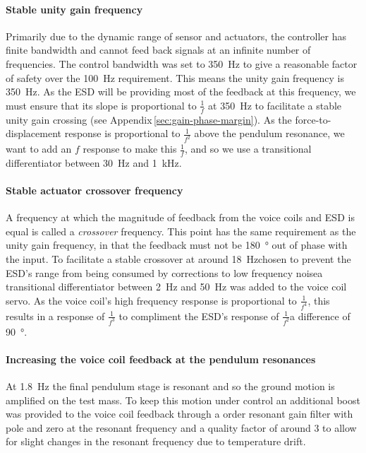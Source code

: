 \paragraph{Stable unity gain frequency}
Primarily due to the dynamic range of sensor and actuators, the controller has finite bandwidth and cannot feed back signals at an infinite number of frequencies. The control bandwidth was set to \SI{350}{\hertz} to give a reasonable factor of safety over the \SI{100}{\hertz} requirement. This means the unity gain frequency is \SI{350}{\hertz}. As the \gls{ESD} will be providing most of the feedback at this frequency, we must ensure that its slope is proportional to $\frac{1}{f}$ at \SI{350}{\hertz} to facilitate a stable unity gain crossing (see Appendix\,\ref{sec:gain-phase-margin}). As the force-to-displacement response is proportional to $\frac{1}{f^2}$ above the pendulum resonance, we want to add an $f$ response to make this $\frac{1}{f}$, and so we use a transitional differentiator between \SI{30}{\hertz} and \SI{1}{\kilo\hertz}.

\paragraph{Stable actuator crossover frequency}
A frequency at which the magnitude of feedback from the voice coils and \gls{ESD} is equal is called a \emph{crossover} frequency. This point has the same requirement as the unity gain frequency, in that the feedback must not be \SI{180}{\degree} out of phase with the input. To facilitate a stable crossover at around \SI{18}{\hertz}\textemdash chosen to prevent the \gls{ESD}'s range from being consumed by corrections to low frequency noise\textemdash a transitional differentiator between \SI{2}{\hertz} and \SI{50}{\hertz} was added to the voice coil servo. As the voice coil's high frequency response is proportional to $\frac{1}{f^4}$, this results in a response of $\frac{1}{f^3}$ to compliment the \gls{ESD}'s response of $\frac{1}{f^2}$\textemdash a difference of \SI{90}{\degree}.

\paragraph{Increasing the voice coil feedback at the pendulum resonances}
At \SI{1.8}{\hertz} the final pendulum stage is resonant and so the ground motion is amplified on the test mass. To keep this motion under control an additional boost was provided to the voice coil feedback through a  order resonant gain filter with pole and zero at the resonant frequency and a quality factor of around \num{3} to allow for slight changes in the resonant frequency due to temperature drift.

